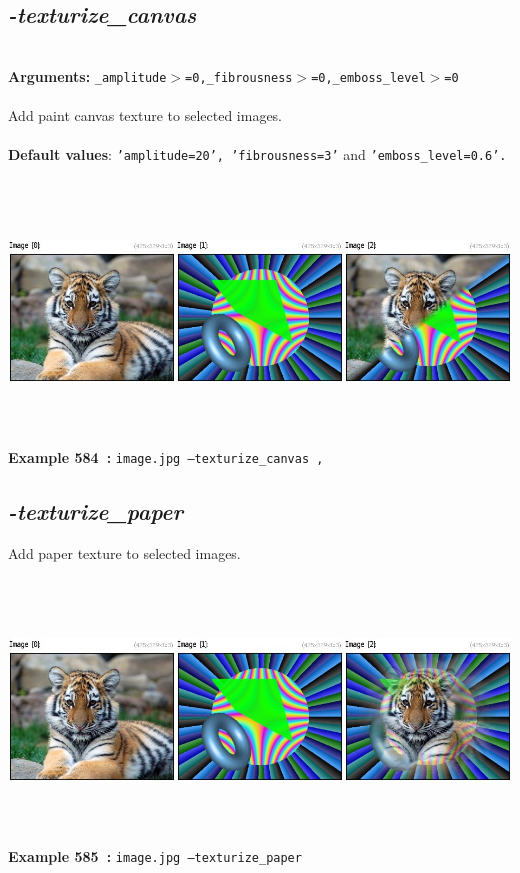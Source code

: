 \documentclass[a4paper,11pt,twoside]{book}
\begin{document}
\subsection{\emph{-texturize\_canvas} }\vspace*{-0.5em}
~\\\textbf{Arguments: } 
{\small \texttt{\_amplitude$>$=0,\_fibrousness$>$=0,\_emboss\_level$>$=0}}\\~\\
Add paint canvas texture to selected images.
~\\~\\\textbf{Default values}: {\small \texttt{'amplitude=20', 'fibrousness=3'} and \texttt{'emboss\_level=0.6'.}}
\begin{center}\includegraphics[keepaspectratio=true,height=7cm,width=\textwidth]{img/gmic_def584.jpg}\\
{\footnotesize \textbf{Example 584~:} \texttt{image.jpg --texturize\_canvas ,}}
\end{center}

\subsection{\emph{-texturize\_paper} }\vspace*{-0.5em}
Add paper texture to selected images.
\begin{center}\includegraphics[keepaspectratio=true,height=7cm,width=\textwidth]{img/gmic_def585.jpg}\\
{\footnotesize \textbf{Example 585~:} \texttt{image.jpg --texturize\_paper}}
\end{center}
\end{document}
